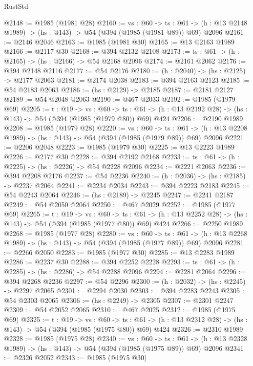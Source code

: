 \begin{lexlean}{RustStd}
\begin{coremodule}
{\begin{coremodule}
{{{{{{{{@2148 := @1985 (@1981 @28)
@2160 := {vs : @60} ->
  {ts : @61} -> (h : @13 @2148 @1989) -> (hs : @143) -> @54 (@394 (@1985 (@1981 @89)) @69) @2096
@2161 := @2146 @2046
@2163 := @1985 (@1981 @30)
@2165 := @13 @2163 @1989
@2166 := @2117 @30
@2168 := @394 @2132 @2108
@2173 := {ts : @61} -> (h : @2165) -> (hs : @2166) -> @54 @2168 @2096
@2174 := @2161 @2062
@2176 := @394 @2148 @2116
@2177 := @54 @2176
@2180 := (h : @2040) -> (hs : @2125) -> @2177 @2063
@2181 := @2174 @2038
@2183 := @394 @2163 @2123
@2185 := @54 @2183 @2063
@2186 := (hs : @2129) -> @2185
@2187 := @2181 @2127
@2189 := @54 @2048 @2063
@2190 := @467 @2033
@2192 := @1985 (@1979 @69)
@2205 := {t : @19} ->
  {vs : @60} ->
  {ts : @61} -> (h : @13 @2192 @28) -> (hs : @143) -> @54 (@394 (@1985 (@1979 @80)) @69) @424
@2206 := @2190 @1989
@2208 := @1985 (@1979 @28)
@2220 := {vs : @60} ->
  {ts : @61} -> (h : @13 @2208 @1989) -> (hs : @143) -> @54 (@394 (@1985 (@1979 @89)) @69) @2096
@2221 := @2206 @2048
@2223 := @1985 (@1979 @30)
@2225 := @13 @2223 @1989
@2226 := @2177 @30
@2228 := @394 @2192 @2168
@2233 := {ts : @61} -> (h : @2225) -> (hs : @2226) -> @54 @2228 @2096
@2234 := @2221 @2063
@2236 := @394 @2208 @2176
@2237 := @54 @2236
@2240 := (h : @2036) -> (hs : @2185) -> @2237 @2064
@2241 := @2234 @2034
@2243 := @394 @2223 @2183
@2245 := @54 @2243 @2064
@2246 := (hs : @2189) -> @2245
@2247 := @2241 @2187
@2249 := @54 @2050 @2064
@2250 := @467 @2029
@2252 := @1985 (@1977 @69)
@2265 := {t : @19} ->
  {vs : @60} ->
  {ts : @61} -> (h : @13 @2252 @28) -> (hs : @143) -> @54 (@394 (@1985 (@1977 @80)) @69) @424
@2266 := @2250 @1989
@2268 := @1985 (@1977 @28)
@2280 := {vs : @60} ->
  {ts : @61} -> (h : @13 @2268 @1989) -> (hs : @143) -> @54 (@394 (@1985 (@1977 @89)) @69) @2096
@2281 := @2266 @2050
@2283 := @1985 (@1977 @30)
@2285 := @13 @2283 @1989
@2286 := @2237 @30
@2288 := @394 @2252 @2228
@2293 := {ts : @61} -> (h : @2285) -> (hs : @2286) -> @54 @2288 @2096
@2294 := @2281 @2064
@2296 := @394 @2268 @2236
@2297 := @54 @2296
@2300 := (h : @2032) -> (hs : @2245) -> @2297 @2065
@2301 := @2294 @2030
@2303 := @394 @2283 @2243
@2305 := @54 @2303 @2065
@2306 := (hs : @2249) -> @2305
@2307 := @2301 @2247
@2309 := @54 @2052 @2065
@2310 := @467 @2025
@2312 := @1985 (@1975 @69)
@2325 := {t : @19} ->
  {vs : @60} ->
  {ts : @61} -> (h : @13 @2312 @28) -> (hs : @143) -> @54 (@394 (@1985 (@1975 @80)) @69) @424
@2326 := @2310 @1989
@2328 := @1985 (@1975 @28)
@2340 := {vs : @60} ->
  {ts : @61} -> (h : @13 @2328 @1989) -> (hs : @143) -> @54 (@394 (@1985 (@1975 @89)) @69) @2096
@2341 := @2326 @2052
@2343 := @1985 (@1975 @30)
}}}}}}}}
\end{coremodule}}
\end{coremodule}
\end{lexlean}
